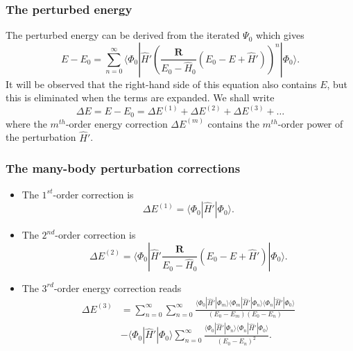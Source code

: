 \documentclass[xcolor=pdftex,hyperref={pdfpagelabels=false},table]{beamer}
\begin{document}
\begin{frame}
\frametitle{The perturbed energy}
\begin{scriptsize}
The perturbed energy can be derived from the iterated $\Psi_0$ which gives
\begin{equation}
\label{eq:176}
E-E_0 = \sum_{n=0}^{\infty} \big\langle   \Phi_0  | \hat{H}' \left(  \frac{\mathbf{R}}{E_0 - \hat{H}_0} (E_0 - E +\hat{H}') \right)^n   |   \Phi_0 \big\rangle.
\end{equation}
It will be observed that the right-hand side of this equation also contains $E$, but this is eliminated when the terms are expanded.
We shall write
\begin{equation}
\nonumber
\Delta E = E -E_0 = \Delta E^{(1)} + \Delta E^{(2)} +\Delta E^{(3)} + \dots
\end{equation}
where the $m^{th}$-order energy correction $\Delta E^{(m)}$ contains the $m^{th}$-order power of the perturbation $\hat{H}'$.
\end{scriptsize}
\end{frame}


\begin{frame}
\frametitle{The many-body perturbation corrections}
\begin{scriptsize}

\begin{itemize}
 \item The $1^{st}$-order correction is 
\begin{equation}
\Delta E^{(1)} = \langle   \Phi_0  | \hat{H}' | \Phi_0 \rangle.
\end{equation}
\item The $2^{nd}$-order correction is 
\begin{equation}
\Delta E^{(2)} = \langle   \Phi_0  | \hat{H}'  \frac{\mathbf{R}}{E_0 - \hat{H}_0} (E_0 - E +\hat{H}')   |   \Phi_0 \rangle.
\end{equation}
\item The $3^{rd}$-order energy correction reads
\begin{align}
\label{eq:3rdOrderMBPT}
\Delta E^{(3)} &= \sum_{n=0}^{\infty} \sum_{n=0}^{\infty}  \frac{  \langle \Phi_0 |\hat{H}'| \Phi_m  \rangle  \langle \Phi_m |\hat{H}'| \Phi_n  \rangle \langle \Phi_n |\hat{H}'| \Phi_0  \rangle }{(E_0 - E_m)(E_0 - E_n)} \\ \nonumber
&  - \langle \Phi_0 |\hat{H}'| \Phi_0  \rangle \sum_{n=0}^{\infty} \frac{ \langle \Phi_0 |\hat{H}'| \Phi_n  \rangle \langle \Phi_n |\hat{H}'| \Phi_0  \rangle }{(E_0 - E_n)^2}.
\end{align}
\end{itemize}

\end{scriptsize}
\end{frame}
\end{document}
